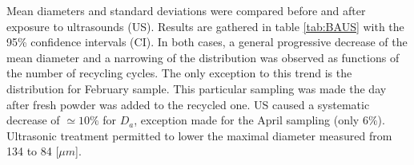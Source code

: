 
 \begin{center}
\begin{table}[ht]
\noindent{}

\caption[Powder samplings recycling history]{Powder samplings recycling history}
\label{tab:detcyc}
\end{table}
 \end{center}

Mean diameters and standard deviations were compared before and after exposure to ultrasounds (US). Results are gathered in table \ref{tab:BAUS} with the 95\% confidence intervals (CI). In both cases, a general progressive decrease of the mean diameter and a narrowing of the distribution was observed as functions of the number of recycling cycles. The only exception to this trend is the distribution for February sample. This particular sampling was made the day after fresh powder was added to the recycled one. US caused a systematic decrease of $\simeq 10\%$ for $D_a$, exception made for the April sampling (only $6\%$). Ultrasonic treatment permitted to lower the maximal diameter measured from 134 to 84 [$\mu m$].  \\

